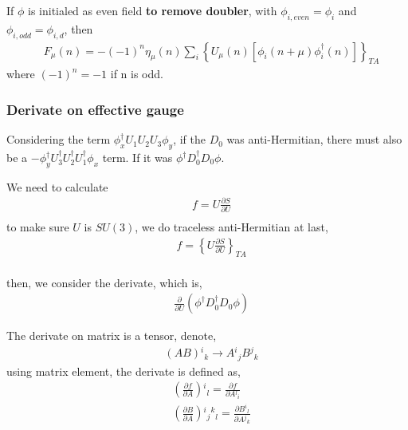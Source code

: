 If $\phi$ is initialed as even field \textbf{to remove doubler}, with $\phi _{i,even} = \phi _i$ and $\phi _{i,odd} = \phi _{i,d}$, then
\begin{equation}
\begin{split}
&F_{\mu}(n)=-(-1)^n\eta _{\mu}(n) \sum _i \left\{U_{\mu}(n)\left[\phi _{i}(n+\mu)\phi _i^{\dagger}(n)\right]\right\}_{TA}
\end{split}
\end{equation}
where $(-1)^n = -1$ if n is odd.

\subsubsection{\label{sec:derivate_on_effective_gauge}Derivate on effective gauge}


Considering the term $\phi _x^{\dagger} U_1U_2U_3\phi _y$, if the $D_0$ was anti-Hermitian, there must also be a $-\phi _y^{\dagger} U_3^{\dagger}U_2^{\dagger}U_1^{\dagger}\phi _x$ term.
If it was $\phi^{\dagger}D_0^{\dagger}D_0\phi$.

We need to calculate
\begin{equation}
\begin{split}
&f=U\frac{\partial S}{\partial U}\\
\end{split}
\end{equation}
to make sure $U$ is $SU(3)$, we do traceless anti-Hermitian at last,
\begin{equation}
\begin{split}
&f=\left\{U\frac{\partial S}{\partial U}\right\}_{TA}\\
\end{split}
\end{equation}

then, we consider the derivate, which is,
\begin{equation}
\begin{split}
&\frac{\partial}{\partial U}\left(\phi^{\dagger}D_0^{\dagger}D_0\phi\right)
\end{split}
\end{equation}


The derivate on matrix is a tensor, denote,
\begin{equation}
\begin{split}
&(AB){}^i{}_k \to A{}^i{}_jB{}^j{}_k
\end{split}
\end{equation}
using matrix element, the derivate is defined as,
\begin{equation}
\begin{split}
&\left(\frac{\partial f}{\partial A}\right){}^i{}_l = \frac{\partial f}{\partial A{}^l{}_i}\\
&\left(\frac{\partial B}{\partial A}\right){}^i{}_j{}^k{}_l = \frac{\partial B{}^i{}_l}{\partial A{}^j{}_k}\\
\end{split}
\end{equation}

